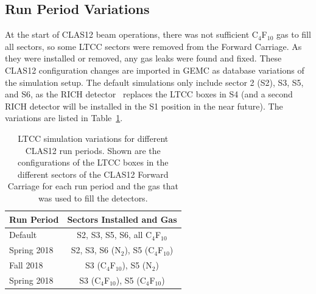 \subsection{Run Period Variations}

At the start of CLAS12 beam operations, there was not sufficient C$_4$F$_{10}$ gas to fill all sectors, so some LTCC
sectors were removed from the Forward Carriage. As they were installed or removed, any gas leaks were found and
fixed. These CLAS12 configuration changes are imported in GEMC as database variations of the simulation setup. The
default simulations only include sector 2 (S2), S3, S5, and S6, as the RICH detector~\cite{rich-nim} replaces the LTCC
boxes in S4 (and a second RICH detector will be installed in the S1 position in the near future). The variations are listed
in Table~\ref{tab:simVariations}.

\begin{table}
	\begin{center}
		\begin{tabular}{| l | c |}
			\hline \hline
			Run Period       & Sectors Installed and Gas \\
			\hline
			Default          & S2, S3, S5, S6, all C$_4$F$_{10}$    \\
			Spring 2018  & S2, S3, S6 (N$_2$), S5 (C$_4$F$_{10}$)  \\
			Fall 2018    & S3 (C$_4$F$_{10}$), S5 (N$_2$)          \\
			Spring 2018  & S3 (C$_4$F$_{10}$), S5 (C$_4$F$_{10}$) \\
			\hline \hline
		\end{tabular}
	\end{center}
	\caption{LTCC simulation variations for different CLAS12 run periods. Shown are the configurations of the
          LTCC boxes in the different sectors of the CLAS12 Forward Carriage for each run period and the gas that
          was used to fill the detectors.}
	\label{tab:simVariations}
\end{table}
